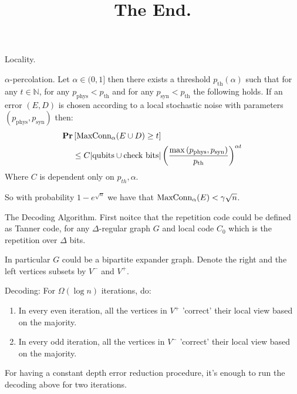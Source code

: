\documentclass{beamer}
\begin{document}
\begin{frame}{Locality.}

  \begin{block}{$\alpha$-percolation.}
    Let $\alpha \in (0,1]$ then there exists a threshold $p_{\text{th}}(\alpha)$ such that for any $t \in \mathbb{N}$, for any $p_{\text{phys}} < p_{\text{th}}$ and for any $p_{\text{syn}} < p_{\text{th}}$ the following holds. If an error $(E,D)$ is chosen according to a local stochastic noise with parameters $(p_{\text{phys}}, p_{ \text{syn}} )$ then: 
    \begin{equation*}
      \begin{split}
        \mathbf{Pr} &\left[ \text{MaxConn}_\alpha (E \cup D) \ge t  \right]  \\ & \le C | \text{qubits} \cup \text{check bits} | \left( \frac{ \max { \left( p_{ \text{phys}  },p_{ \text{syn}  }    \right)   } }{p_{ \text{th} } } \right)^{\alpha t}  
      \end{split}
    \end{equation*}
    Where $C$ is dependent only on $p_{th}, \alpha$. 
  \end{block}


So with probability $1 - e^{\sqrt{n}}$ we have that $\text{MaxConn}_\alpha(E) < \gamma \sqrt{n}$.  

\end{frame}

\begin{frame}
  \title{ The End.  }
    \titlepage
\end{frame}



\begin{frame}{The Decoding Algorithm.}
  First noitce that the repetition code could be defined as Tanner code, for any $\Delta$-regular graph $G$ and local code $C_{0}$ which is the repetition over $\Delta$ bits.   


  In particular $G$ could be a bipartite expander graph. Denote the right and the left vertices subsets by $V^{-}$ and $V^{+}$.
  \begin{block}{Decoding:}
    For $\Omega\left( \log n \right)$ iterations, do: 
  \begin{enumerate}
    \item In every even iteration, all the vertices in $V^{+}$ 'correct' their local view based on the majority.
    \item In every odd iteration, all the vertices in $V^{-}$ 'correct' their local view based on the majority.
  \end{enumerate}
For having a constant depth error reduction procedure, it's enough to run the decoding above for two iterations.
\end{block}

\end{frame}
\end{document}
